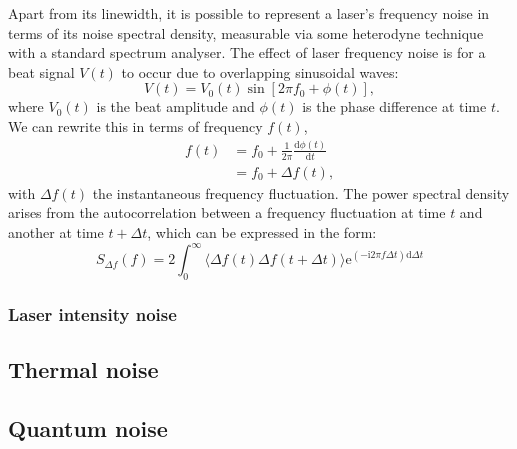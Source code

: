 Apart from its linewidth, it is possible to represent a laser's frequency noise in terms of its noise spectral density, measurable via some heterodyne technique with a standard spectrum analyser. The effect of laser frequency noise is for a beat signal $V \left( t \right)$ to occur due to overlapping sinusoidal waves:
\begin{equation}
  V \left( t \right) = V_0 \left( t \right) \sin \left[ 2 \pi f_0 + \phi \left( t \right) \right],
\end{equation}
where $V_0 \left( t \right)$ is the beat amplitude and $\phi \left( t \right)$ is the phase difference at time $t$. We can rewrite this in terms of frequency $f \left( t \right)$,
\begin{equation}
  \begin{split}
    f \left( t \right) &= f_0 + \frac{1}{2 \pi} \frac{\text{d} \phi \left( t \right)}{\text{d} t} \\
                       &= f_0 + \Delta f \left( t \right),
  \end{split}
\end{equation}
with $\Delta f \left( t \right)$ the instantaneous frequency fluctuation. The power spectral density arises from the autocorrelation between a frequency fluctuation at time $t$ and another at time $t + \Delta t$, which can be expressed in the form:
\begin{equation}
  S_{\Delta f} \left( f \right) = 2 \int^{\infty}_{0} \langle \Delta f \left( t \right) \Delta f \left( t + \Delta t \right) \rangle \text{e}^{\left( -\text{i2}\pi f \Delta t \right) \text{d}\Delta t}
\end{equation}




\subsubsection{Laser intensity noise}

\subsection{Thermal noise}

\subsection{Quantum noise}

